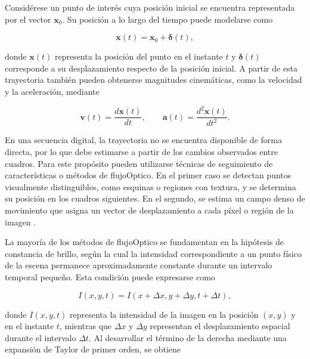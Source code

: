Considérese un punto de interés cuya posición inicial se encuentra representada por el vector $\mathbf{x}_0$. Su posición a lo largo del tiempo puede modelarse como

\begin{equation}
    \mathbf{x}(t)=\mathbf{x}_0+\boldsymbol{\delta}(t),
    \label{eq:trayectoria_lagrangiana}
\end{equation}

donde $\mathbf{x}(t)$ representa la posición del punto en el instante $t$ y $\boldsymbol{\delta}(t)$ corresponde a su desplazamiento respecto de la posición inicial. A partir de esta trayectoria también pueden obtenerse magnitudes cinemáticas, como la velocidad y la aceleración, mediante

\begin{equation}
    \mathbf{v}(t)=\frac{d\mathbf{x}(t)}{dt},
    \qquad
    \mathbf{a}(t)=\frac{d^2\mathbf{x}(t)}{dt^2}.
    \label{eq:cinematica_lagrangiana}
\end{equation}

En una secuencia digital, la trayectoria no se encuentra disponible de forma directa, por lo que debe estimarse a partir de los cambios observados entre cuadros. Para este propósito pueden utilizarse técnicas de seguimiento de características o métodos de \gls{flujoOptico}. En el primer caso se detectan puntos visualmente distinguibles, como esquinas o regiones con textura, y se determina su posición en los cuadros siguientes. En el segundo, se estima un campo denso de movimiento que asigna un vector de desplazamiento a cada píxel o región de la imagen \cite{lucas1981registration,horn1981flow}.

La mayoría de los métodos de \gls{flujoOptico} se fundamentan en la hipótesis de constancia de brillo, según la cual la intensidad correspondiente a un punto físico de la escena permanece aproximadamente constante durante un intervalo temporal pequeño. Esta condición puede expresarse como

\begin{equation}
    I(x,y,t)=I(x+\Delta x,y+\Delta y,t+\Delta t),
    \label{eq:constancia_brillo_lagrangiana}
\end{equation}

donde $I(x,y,t)$ representa la intensidad de la imagen en la posición $(x,y)$ y en el instante $t$, mientras que $\Delta x$ y $\Delta y$ representan el desplazamiento espacial durante el intervalo $\Delta t$. Al desarrollar el término de la derecha mediante una expansión de Taylor de primer orden, se obtiene

